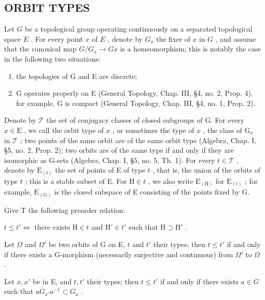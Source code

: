 \subsection{ORBIT TYPES}

Let \(G\) be a topological group operating continuously on a separated topological space \(E\) . For every point \(x\) of \(E\) , denote by \(G_x\) the fixer of \(x\) in \(G\) , and assume that the canonical map \(G / G_x \to Gx\) is a homeomorphism; this is notably the case in the following two situations:

\begin{enumerate}
\def\labelenumi{\alph{enumi})}
\item
  the topologies of G and E are discrete;
\item
  G operates properly on E (General Topology, Chap. III, §4, no. 2, Prop. 4), for example, G is compact (General Topology, Chap. III, §4, no. 1, Prop. 2).
\end{enumerate}

Denote by \(\mathcal{T}\) the set of conjugacy classes of closed subgroups of G. For every \(x\in \mathrm{E}\) , we call the orbit type of \(x\) , or sometimes the type of \(x\) , the class of \(\mathrm{G}_x\) in \(\mathcal{T}\) ; two points of the same orbit are of the same orbit type (Algebra, Chap. I, §5, no. 2, Prop. 2); two orbits are of the same type if and only if they are isomorphic as G-sets (Algebra, Chap. I, §5, no. 5, Th. 1). For every \(t\in \mathcal{T}\) , denote by \(\mathrm{E}_{(t)}\) the set of points of E of type \(t\) , that is, the union of the orbits of type \(t\) ; this is a stable subset of E. For \(\mathrm{H}\in t\) , we also write \(\mathrm{E}_{(\mathrm{H})}\) for \(\mathrm{E}_{(t)}\) ; for example, \(\mathrm{E}_{(\mathrm{G})}\) is the closed subspace of E consisting of the points fixed by G.

Give T the following preorder relation:

\(t \leq t'\Longleftrightarrow\) there exists \(\mathrm{H} \in t\) and \(\mathrm{H}' \in t'\) such that \(\mathrm{H} \supset \mathrm{H}'\) .

Let \(\Omega\) and \(\Omega'\) be two orbits of G on E, \(t\) and \(t'\) their types; then \(t \leq t'\) if and only if there exists a G-morphism (necessarily surjective and continuous) from \(\Omega'\) to \(\Omega\) .

Let \(x, x'\) be in E, and \(t, t'\) their types; then \(t \leq t'\) if and only if there exists \(a \in G\) such that \(aG_{x'}a^{-1} \subset G_x\) .

